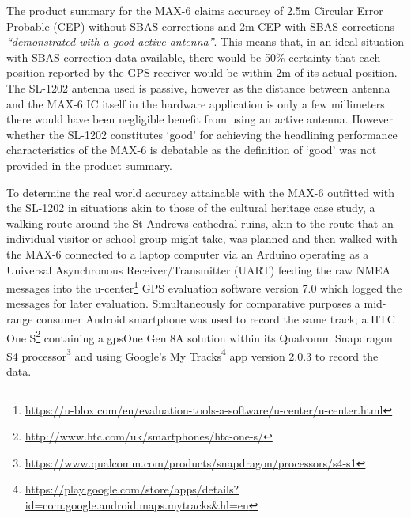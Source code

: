 \newcommand{\ucenterFootnote}{\footnote{\url{https://u-blox.com/en/evaluation-tools-a-software/u-center/u-center.html}}}

\newcommand{\htconesFootnote}{\footnote{\url{http://www.htc.com/uk/smartphones/htc-one-s/}}}

\newcommand{\snapdragonFootnote}{\footnote{\url{https://www.qualcomm.com/products/snapdragon/processors/s4-s1}}}

\newcommand{\mytracksFootnote}{\footnote{\url{https://play.google.com/store/apps/details?id=com.google.android.maps.mytracks&hl=en}}}

\newcommand{\hausdorffFootnote}{\footnote{\url{http://postgis.net/docs/ST_HausdorffDistance.html}}}


The product summary for the MAX-6 claims accuracy of 2.5m Circular Error Probable (CEP) without SBAS corrections and 2m CEP with SBAS corrections \textit{``demonstrated with a good active antenna''}\ubloxcepFootnote{}. This means that, in an ideal situation with SBAS correction data available, there would be 50\% certainty that each position reported by the GPS receiver would be within 2m of its actual position. The SL-1202 antenna used is passive, however as the distance between antenna and the MAX-6 IC itself in the hardware application is only a few millimeters there would have been negligible benefit from using an active antenna. However whether the SL-1202 constitutes `good' for achieving the headlining performance characteristics of the MAX-6 is debatable as the definition of `good' was not provided in the product summary.

To determine the real world accuracy attainable with the MAX-6 outfitted with the SL-1202 in situations akin to those of the cultural heritage case study, a walking route around the St Andrews cathedral ruins, akin to the route that an individual visitor or school group might take, was planned and then walked with the MAX-6 connected to a laptop computer via an Arduino operating as a Universal Asynchronous Receiver/Transmitter (UART) feeding the raw NMEA messages into the u-center\ucenterFootnote{} GPS evaluation software version 7.0 which logged the messages for later evaluation. Simultaneously for comparative purposes a mid-range consumer Android smartphone was used to record the same track; a HTC One S\htconesFootnote{} containing a gpsOne Gen 8A solution within its Qualcomm Snapdragon S4 processor\snapdragonFootnote{} and using Google's My Tracks\mytracksFootnote{} app version 2.0.3 to record the data.

